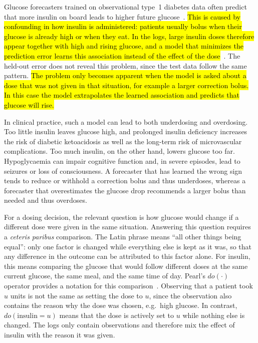 \documentclass[a4paper,fleqn]{cas-sc}
\begin{document}
Glucose forecasters trained on observational type~1 diabetes data often predict
that more insulin on board leads to higher future glucose~\citep{prendin2023,kushner2020,cappon2023,geirhos2020}.
\hl{This is caused by confounding in how insulin is administered: patients usually
bolus when their glucose is already high or when they eat. In the logs, large
insulin doses therefore appear together with high and rising glucose, and a
model that minimizes the prediction error learns this association instead of
the effect of the dose}~\citep{pearl2009causality,scholkopf2021}.
The held-out error does not reveal this problem, since the test data follow the
same pattern. \hl{The problem only becomes apparent when the model is asked about a dose that was not
given in that situation, for example a larger correction bolus. In this case
the model extrapolates the learned association and predicts that glucose will
rise.}

In clinical practice, such a model can lead to both underdosing and overdosing.
Too little insulin leaves glucose high, and prolonged insulin deficiency
increases the risk of diabetic ketoacidosis as well as the long-term risk of
microvascular complications. Too much insulin, on the other hand, lowers
glucose too far. Hypoglycaemia can impair cognitive function and, in severe
episodes, lead to seizures or loss of consciousness. A forecaster that has
learned the wrong sign tends to reduce or withhold a correction bolus and thus
underdoses, whereas a forecaster that overestimates the glucose drop recommends
a larger bolus than needed and thus overdoses.

For a dosing decision, the relevant question is how glucose would change if a
different dose were given in the same situation. Answering this question
requires a \emph{ceteris paribus} comparison. The Latin phrase means ``all
other things being equal'': only one factor is changed while everything else is
kept as it was, so that any difference in the outcome can be attributed to this
factor alone. For insulin, this means comparing the glucose that would follow
different doses at the same current glucose, the same meal, and the same time
of day. Pearl's $do(\cdot)$ operator provides a notation for this
comparison~\citep{pearl2009causality,pearl2019tools}. Observing that a patient
took $u$ units is not the same as setting the dose to $u$, since the
observation also contains the reason why the dose was chosen, e.g.\ high
glucose. In contrast, $do(\mathrm{insulin}{=}u)$ means that the dose is
actively set to $u$ while nothing else is changed. The logs only contain
observations and therefore mix the effect of insulin with the reason it was
given.
\end{document}
